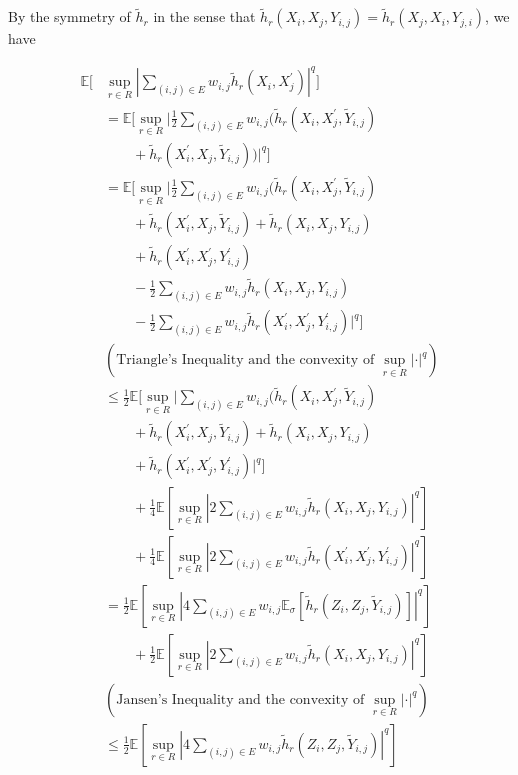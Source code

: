 \documentclass[letterpaper]{article} %
\def\DoubleColumn{}
\newcommand{\E}{\mathbb{E}}
\newcommand{\pair}[1]{(#1)}
\begin{document}
    By the symmetry of $\tilde{h}_r$ in the sense that $\tilde{h}_r(X_i,X_j,Y_{i,j})=\tilde{h}_r(X_j,X_i,Y_{j,i})$, we have
    \DoubleColumn
    \begin{align*}
        \E[&\sup_{r\in R} |\sum_{\pair{i,j}\in E}w_{i,j}\tilde{h}_r(X_i,X_j^\prime)|^q]\\
        &=\E[\sup_{r\in R} |\frac{1}{2}\sum_{\pair{i,j}\in E}w_{i,j}(\tilde{h}_r(X_i,X_j^\prime,\tilde{Y}_{i,j})\\
        &\qquad+\tilde{h}_r(X_i^\prime,X_j,\tilde{Y}_{i,j}))|^q]\\
        &= \E[\sup_{r\in R} |\frac{1}{2}\sum_{\pair{i,j}\in E}w_{i,j}(\tilde{h}_r(X_i,X_j^\prime,\tilde{Y}_{i,j})\\
        &\qquad+\tilde{h}_r(X_i^\prime,X_j,\tilde{Y}_{i,j})+\tilde{h}_r(X_i,X_j,Y_{i,j})\\
        &\qquad+\tilde{h}_r(X_i^\prime,X_j^\prime,Y^\prime_{i,j})\\
        &\qquad-\frac{1}{2}\sum_{\pair{i,j}\in E}w_{i,j}\tilde{h}_r(X_i,X_j,Y_{i,j})\\
        &\qquad-\frac{1}{2}\sum_{\pair{i,j}\in E}w_{i,j}\tilde{h}_r(X_i^\prime,X_j^\prime,Y^\prime_{i,j})|^q]\\
        &(\text{Triangle's Inequality and the convexity of }\sup_{r\in R}|\cdot|^q)\\
        &\le \frac{1}{2}\E[\sup_{r\in R} |\sum_{\pair{i,j}\in E}w_{i,j}(\tilde{h}_r(X_i,X_j^\prime,\tilde{Y}_{i,j})\\
        &\qquad+\tilde{h}_r(X_i^\prime,X_j,\tilde{Y}_{i,j})+\tilde{h}_r(X_i,X_j,Y_{i,j})\\
        &\qquad+\tilde{h}_r(X_i^\prime,X_j^\prime,Y^\prime_{i,j})|^q]\\
        &\qquad+ \frac{1}{4}\E[\sup_{r\in R} |2\sum_{\pair{i,j}\in E}w_{i,j}\tilde{h}_r(X_i,X_j,Y_{i,j})|^q] \\
        &\qquad+ \frac{1}{4}\E[\sup_{r\in R} |2\sum_{\pair{i,j}\in E}w_{i,j}\tilde{h}_r(X_i^\prime,X_j^\prime,Y^\prime_{i,j})|^q]\\
        &= \frac{1}{2}\E[\sup_{r\in R} |4\sum_{\pair{i,j}\in E}w_{i,j}\E_\sigma[\tilde{h}_r(Z_i,Z_j,\tilde{Y}_{i,j})]|^q]\\
        &\qquad+ \frac{1}{2}\E[\sup_{r\in R} |2\sum_{\pair{i,j}\in E}w_{i,j}\tilde{h}_r(X_i,X_j,Y_{i,j})|^q]\\
        &(\text{Jansen's Inequality and the convexity of }\sup_{r\in R}|\cdot|^q)\\
        &\le \frac{1}{2}\E[\sup_{r\in R} |4\sum_{\pair{i,j}\in E}w_{i,j}\tilde{h}_r(Z_i,Z_j,\tilde{Y}_{i,j})|^q] \\

\end{align*}
\end{document}
